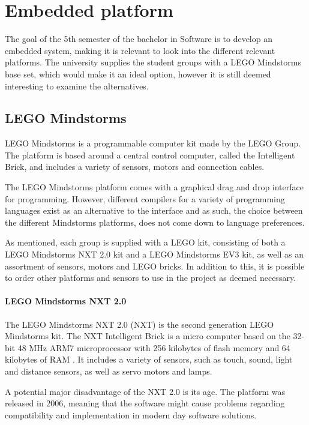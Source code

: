 

\section{Embedded platform}
The goal of the 5th semester of the bachelor in Software is to develop an embedded system, making it is relevant to look into the different relevant platforms.
The university supplies the student groups with a LEGO Mindstorms base set, which would make it an ideal option, however it is still deemed interesting to examine the alternatives.

\subsection{LEGO Mindstorms}
LEGO Mindstorms is a programmable computer kit made by the LEGO Group.
The platform is based around a central control computer, called the Intelligent Brick, and includes a variety of sensors, motors and connection cables.

The LEGO Mindstorms platform comes with a graphical drag and drop interface for programming.
However, different compilers for a variety of programming languages exist as an alternative to the interface and as such, the choice between the different Mindstorms platforms, does not come down to language preferences.

As mentioned, each group is supplied with a LEGO kit, consisting of both a LEGO Mindstorms NXT 2.0 kit and a LEGO Mindstorms EV3 kit, as well as an assortment of sensors, motors and LEGO bricks.
In addition to this, it is possible to order other platforms and sensors to use in the project as deemed necessary.

\paragraph{LEGO Mindstorms NXT 2.0}
The LEGO Mindstorms NXT 2.0 (NXT) is the second generation LEGO Mindstorms kit.
The NXT Intelligent Brick is a micro computer based on the 32-bit 48 MHz ARM7 microprocessor with 256 kilobytes of flash memory and 64 kilobytes of RAM \cite{nxt2userguide} \cite{nxt2ev3compare}.
It includes a variety of sensors, such as touch, sound, light and distance sensors, as well as servo motors and lamps.

A potential major disadvantage of the NXT 2.0 is its age.
The platform was released in 2006, meaning that the software might cause problems regarding compatibility and implementation in modern day software solutions.

